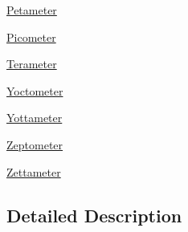\begin{DoxyCompactItemize}
\item 
\mbox{\hyperlink{group___e_g_x_math-_conversions-_length_conversions-_s_i-_petameter}{Petameter}}
\item 
\mbox{\hyperlink{group___e_g_x_math-_conversions-_length_conversions-_s_i-_picometer}{Picometer}}
\item 
\mbox{\hyperlink{group___e_g_x_math-_conversions-_length_conversions-_s_i-_terameter}{Terameter}}
\item 
\mbox{\hyperlink{group___e_g_x_math-_conversions-_length_conversions-_s_i-_yoctometer}{Yoctometer}}
\item 
\mbox{\hyperlink{group___e_g_x_math-_conversions-_length_conversions-_s_i-_yottameter}{Yottameter}}
\item 
\mbox{\hyperlink{group___e_g_x_math-_conversions-_length_conversions-_s_i-_zeptometer}{Zeptometer}}
\item 
\mbox{\hyperlink{group___e_g_x_math-_conversions-_length_conversions-_s_i-_zettameter}{Zettameter}}
\end{DoxyCompactItemize}


\subsection{Detailed Description}

